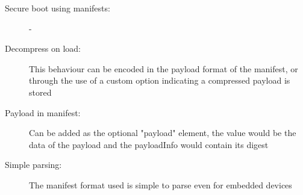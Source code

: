 \documentclass[0-thesis.tex]{subfiles}
\begin{document}
\begin{description}
    \item[Secure boot using manifests:]
        - %

    \item[Decompress on load:]
        This behaviour can be encoded in the payload format of the manifest, or through
        the use of a custom option indicating a compressed payload is stored

    \item[Payload in manifest:]
        Can be added as the optional "payload" element, the value would be the data of the
        payload and the payloadInfo would contain its digest

    \item[Simple parsing:]
        The manifest format used is simple to parse even for embedded devices
\end{description}
\end{document}
